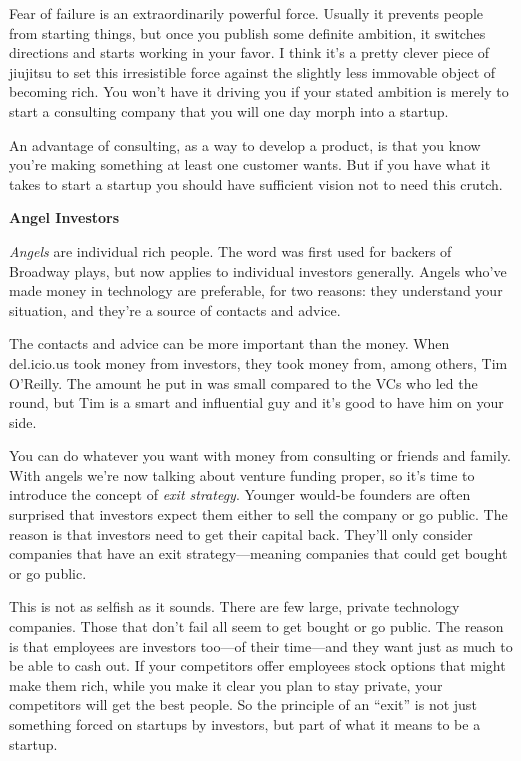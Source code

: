 Fear of failure is an extraordinarily powerful force. Usually it
prevents people from starting things, but once you publish some definite
ambition, it switches directions and starts working in your favor. I
think it's a pretty clever piece of jiujitsu to set this irresistible
force against the slightly less immovable object of becoming rich. You
won't have it driving you if your stated ambition is merely to start a
consulting company that you will one day morph into a startup.

An advantage of consulting, as a way to develop a product, is that you
know you're making something at least one customer wants. But if you
have what it takes to start a startup you should have sufficient vision
not to need this crutch.

\textbf{Angel Investors}

\emph{Angels} are individual rich people. The word was first used for
backers of Broadway plays, but now applies to individual investors
generally. Angels who've made money in technology are preferable, for
two reasons: they understand your situation, and they're a source of
contacts and advice.

The contacts and advice can be more important than the money. When
del.icio.us took money from investors, they took money from, among
others, Tim O'Reilly. The amount he put in was small compared to the VCs
who led the round, but Tim is a smart and influential guy and it's good
to have him on your side.

You can do whatever you want with money from consulting or friends and
family. With angels we're now talking about venture funding proper, so
it's time to introduce the concept of \emph{exit strategy}. Younger
would-be founders are often surprised that investors expect them either
to sell the company or go public. The reason is that investors need to
get their capital back. They'll only consider companies that have an
exit strategy---meaning companies that could get bought or go public.

This is not as selfish as it sounds. There are few large, private
technology companies. Those that don't fail all seem to get bought or go
public. The reason is that employees are investors too---of their
time---and they want just as much to be able to cash out. If your
competitors offer employees stock options that might make them rich,
while you make it clear you plan to stay private, your competitors will
get the best people. So the principle of an ``exit'' is not just
something forced on startups by investors, but part of what it means to
be a startup.

